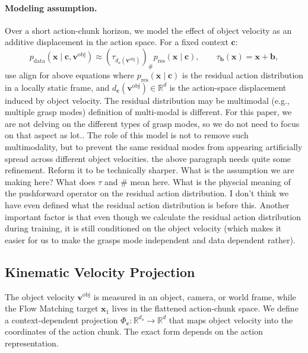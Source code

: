 \documentclass[10pt,twocolumn,letterpaper]{article}
\newcommand{\EditAP}[1]{{\color{blue} #1}}
\begin{document}
\paragraph{Modeling assumption.}
Over a short action-chunk horizon, we model the effect of object velocity as an
additive displacement in the action space. For a fixed context $\mathbf c$:
\begin{equation}
    p_{\mathrm{data}}(\mathbf x \mid \mathbf c, \mathbf v^\text{obj})
    \approx
    \left(\tau_{d_{\mathbf c}(\mathbf v^\text{obj})}\right)_{\#}
    p_{\mathrm{res}}(\mathbf x \mid \mathbf c),
    \qquad
    \tau_{\mathbf b}(\mathbf x) = \mathbf x + \mathbf b,
    \label{eq:velocity_pushforward_model}
\end{equation}
\EditAP{use align for above equations}
where $p_{\mathrm{res}}(\mathbf x \mid \mathbf c)$ is the residual action
distribution in a locally static frame, and
$d_{\mathbf c}(\mathbf v^\text{obj}) \in \mathbb R^d$ is the action-space displacement
induced by object velocity. The residual distribution may be multimodal (e.g.,
multiple grasp modes) \EditAP{definition of multi-modal is different. For this paper, we are not delving on the different types of grasp modes, so we do not need to focus on that aspect as lot.}. The role of this model is not to remove such
multimodality, but to prevent the same residual modes from appearing
artificially spread across different object velocities.
\EditAP{the above paragraph needs quite some refinement. Reform it to be technically sharper. What is the assumption we are making here? What does $\tau$ and $\#$ mean here. What is the physcial meaning of the pushforward operator on the residual action distribution. I don't think we have even defined what the residual action distribution is before this. Another important factor is that even though we calculate the residual action distribution during training, it is still conditioned on the object velocity (which makes it easier for us to make the grasps mode independent and data dependent rather).}
\subsection{Kinematic Velocity Projection}
\label{subsec:kinematic_projection}

The object velocity $\mathbf v^\text{obj}$ is measured in an object, camera, or world
frame, while the Flow Matching target $\mathbf x_1$ lives in the flattened
action-chunk space. We define a context-dependent projection
$\Phi_{\mathbf c}:\mathbb R^{d_o}\rightarrow\mathbb R^d$ that maps object
velocity into the coordinates of the action chunk. The exact form depends on the
action representation.
\end{document}
